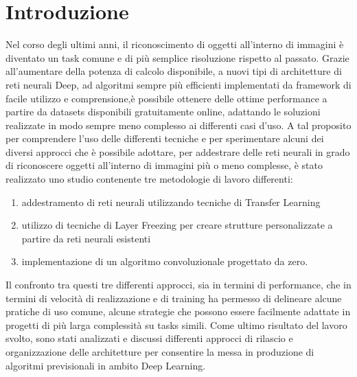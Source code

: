 \section{Introduzione}
Nel corso degli ultimi anni, il riconoscimento di oggetti all'interno di immagini è diventato un task comune e di più semplice risoluzione rispetto al passato.
Grazie all'aumentare della potenza di calcolo disponibile, a nuovi tipi di architetture di reti neurali Deep, ad algoritmi sempre più efficienti implementati da framework di facile utilizzo e comprensione,è possibile ottenere delle ottime performance a partire da datasets disponibili gratuitamente online, adattando le soluzioni realizzate in modo sempre meno complesso ai differenti casi d'uso.  
A tal proposito per comprendere l'uso delle differenti tecniche e per sperimentare alcuni dei diversi approcci che è possibile adottare, per addestrare delle reti neurali in grado di riconoscere oggetti all'interno di immagini più o meno complesse, è stato realizzato uno studio contenente tre metodologie di lavoro differenti:
\begin{enumerate}
\item addestramento di reti neurali utilizzando tecniche di Transfer Learning \cite{transferlearning}
\item utilizzo di tecniche di Layer Freezing per creare strutture personalizzate a partire da reti neurali esistenti
\item implementazione di un algoritmo convoluzionale progettato da zero.
\end{enumerate}

Il confronto tra questi tre differenti approcci, sia in termini di performance, che in termini di velocità di realizzazione e di training ha permesso di delineare alcune pratiche di uso comune, alcune strategie che possono essere facilmente adattate in progetti di più larga complessità su tasks simili.  
Come ultimo risultato del lavoro svolto, sono stati analizzati e discussi differenti approcci di rilascio e organizzazione delle architetture per consentire la messa in produzione di algoritmi previsionali in ambito Deep Learning.


